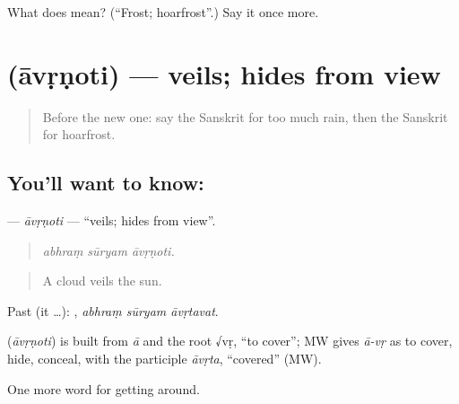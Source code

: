 \begin{tcolorbox}[breakable,colback=teal!4,colframe=teal!35!black,title={Before you move on}]
What does  mean? (\textquotedblleft{}Frost; hoarfrost\textquotedblright{}.) Say it once more.
\end{tcolorbox}
\section[\texorpdfstring{\sk{आवृणोति} (āvṛṇoti)}{आवृणोति (āvṛṇoti)}]{ (āvṛṇoti) — veils; hides from view}

\label{lesson:SA-C441-avrnoti}



\begin{quote}
Before the new one: say the Sanskrit for too much rain, then the Sanskrit for hoarfrost.
\end{quote}

\subsection*{You'll want to know: }
\textbf{} — \emph{āvṛṇoti} — \textquotedblleft{}veils; hides from view\textquotedblright{}.

\begin{quote}
  
\end{quote}

\begin{quote}
\emph{abhraṃ sūryam āvṛṇoti.}
\end{quote}

\begin{quote}
A cloud veils the sun.
\end{quote}

Past (it …):   , \emph{abhraṃ sūryam āvṛtavat}.

\begin{cousinweb}
\textbf{} (\emph{āvṛṇoti}) is built from \emph{ā} and the root √vṛ, \textquotedblleft{}to cover\textquotedblright{}; MW gives \emph{ā-vṛ} as to cover, hide, conceal, with the participle \emph{āvṛta}, \textquotedblleft{}covered\textquotedblright{} (MW).
\end{cousinweb}

\begin{grammarlens}[title={What you've built}]
One more word for getting around.
\end{grammarlens}

